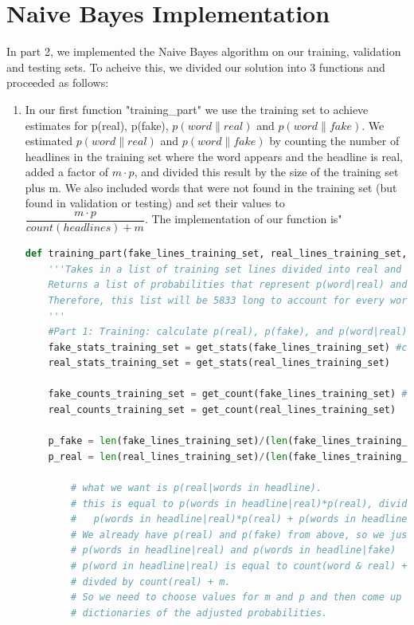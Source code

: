 \documentclass{article}
\begin{document}
   \section{Naive Bayes Implementation}
In part 2, we implemented the Naive Bayes algorithm on our training, validation and testing sets.
To acheive this, we divided our solution into 3 functions and proceeded as follows:
\begin{enumerate}
\item In our first function "training\_part" we use the training set to achieve estimates for p(real), p(fake), $p(word\|real)$ and $p(word\|fake)$. We estimated $ p(word\|real)$ and $p(word\|fake)$ by counting the number of
headlines in the training set where the word appears and the headline is real, added a factor of $ m\cdot p$, and divided this result by the size of the training set plus m. We also included words that were not found in the 
training set (but found in validation or testing) and set their values to $ \dfrac {m \cdot p}{count(headlines) + m}$.
The implementation of our function is"
\begin{lstlisting}[language=Python]
def training_part(fake_lines_training_set, real_lines_training_set, m, p):
    '''Takes in a list of training set lines divided into real and fake groups.
    Returns a list of probabilities that represent p(word|real) and p(word|fake).
    Therefore, this list will be 5833 long to account for every word.
    '''
    #Part 1: Training: calculate p(real), p(fake), and p(word|real), p(word|fake)
    fake_stats_training_set = get_stats(fake_lines_training_set) #compute probabilities for each word
    real_stats_training_set = get_stats(real_lines_training_set)
    
    fake_counts_training_set = get_count(fake_lines_training_set) #compute counts for each word
    real_counts_training_set = get_count(real_lines_training_set)
    
    p_fake = len(fake_lines_training_set)/(len(fake_lines_training_set) + len(real_lines_training_set))
    p_real = len(real_lines_training_set)/(len(fake_lines_training_set) + len(real_lines_training_set))
    
        # what we want is p(real|words in headline).
        # this is equal to p(words in headline|real)*p(real), divided by
        #   p(words in headline|real)*p(real) + p(words in headline|fake)*p(fake)
        # We already have p(real) and p(fake) from above, so we just need to find
        # p(words in headline|real) and p(words in headline|fake)
        # p(word in headline|real) is equal to count(word & real) + mp
        # divded by count(real) + m.
        # So we need to choose values for m and p and then come up with a
        # dictionaries of the adjusted probabilities.
    

\end{lstlisting}
\end{enumerate}
\end{document}
